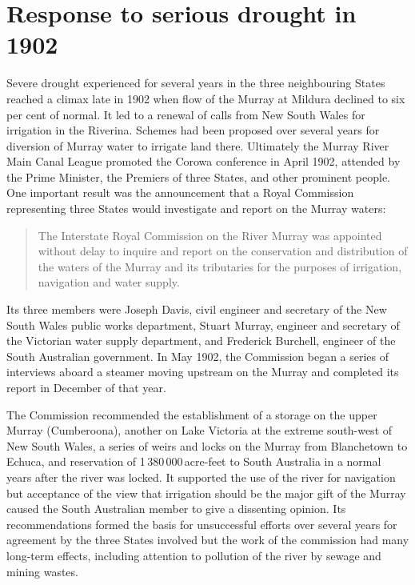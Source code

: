 \section*{Response to serious drought in 1902}

Severe drought experienced for several years in the three neighbouring
States reached a climax late in 1902 when flow of the Murray
 at Mildura declined to six per cent of normal. It
led to a renewal of calls from New South Wales for irrigation in the
Riverina.  Schemes had been proposed over several years for diversion
of Murray water to irrigate land there.  Ultimately the Murray River
Main Canal League promoted the Corowa conference in April 1902,
attended by the Prime Minister, the Premiers of three States, and
other prominent people.  One important result was the announcement
that a Royal Commission representing three States would investigate
and report on the Murray waters:
\begin{quote}
	The Interstate Royal Commission on the River Murray
	 was appointed without
	delay to inquire and report on the conservation and
	distribution of the waters of the Murray and its tributaries
	for the purposes of irrigation, navigation and water supply.
\end{quote}

Its three members were Joseph Davis,  civil engineer
and secretary of the New South Wales public works department, Stuart
Murray,  engineer and secretary of the Victorian
water supply department, and Frederick Burchell, 
engineer of the South Australian government.  In May 1902, the
Commission began a series of interviews aboard a steamer moving
upstream on the Murray and completed its report in December of that
year.

The Commission recommended the establishment of a storage on the upper
Murray (Cu\-m\-ber\-oona), another on Lake Victoria
 at the extreme south-west of New South Wales, a
series of weirs
 and locks on the Murray  from
Blanche\-town
 to
Echuca,  and reservation of 1\,380\,000\,acre-feet
to South Australia in a normal years after the river was locked. It
supported the use of the river for navigation but acceptance of the
view that irrigation should be the major gift of the Murray caused the
South Australian member to give a dissenting opinion.  Its
recommendations formed the basis for unsuccessful efforts over several
years for agreement by the three States involved but the work of the
commission had many long-term effects, including attention to
pollution of the river by sewage and mining wastes.

